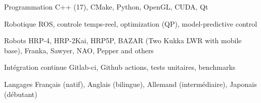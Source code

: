 

\begin{cvskills}

  \cvskill
    {Programmation} %
    {C++ (17), CMake, Python, OpenGL, CUDA, Qt} %

  \cvskill
    {Robotique} %
    {ROS, controle temps-reel, optimization (QP), model-predictive control} %

  \cvskill
    {Robots} %
    {HRP-4, HRP-2Kai, HRP5P, BAZAR (Two Kukka LWR with mobile base), Franka, Sawyer, NAO, Pepper and others} %

  \cvskill
    {Intégration continue} %
    {Gitlab-ci, Github actions, tests unitaires, benchmarks} %


  \cvskill
    {Langages} %
    {Français (natif), Anglais (bilingue), Allemand (intermédiaire), Japonais (débutant)} %
\end{cvskills}
